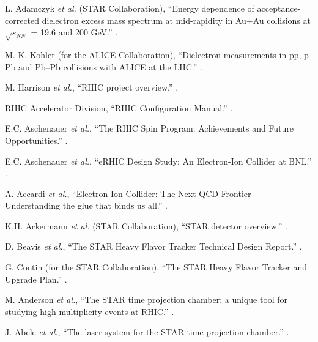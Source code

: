 \begin{thebibliography}{10}
L. Adamczyk {\it et al.} (STAR Collaboration),
\newblock ``Energy dependence of acceptance-corrected dielectron excess mass spectrum at mid-rapidity in Au+Au collisions at $\sqrt{s_{NN}}$ = 19.6 and 200 GeV.''
.

M. K. Kohler (for the ALICE Collaboration),
\newblock ``Dielectron measurements in pp, p–Pb and Pb–Pb collisions with ALICE at the LHC.''
.

M. Harrison {\it et al.},
\newblock ``RHIC project overview.''
.

RHIC Accelerator Division,
\newblock ``RHIC Configuration Manual.''
.

E.C. Aschenauer {\it et al.},
\newblock ``The RHIC Spin Program: Achievements and Future Opportunities.''
.

E.C. Aschenauer {\it et al.},
\newblock ``eRHIC Design Study: An Electron-Ion Collider at BNL.''
.

A. Accardi {\it et al.},
\newblock ``Electron Ion Collider: The Next QCD Frontier - Understanding the glue that binds us all.''
.

K.H. Ackermann {\it et al.} (STAR Collaboration),
\newblock ``STAR detector overview.''
.

 D. Beavis {\it et al.},
\newblock ``The STAR Heavy Flavor Tracker Technical Design Report.''
.

G. Contin (for the STAR Collaboration),
\newblock ``The STAR Heavy Flavor Tracker and Upgrade Plan.''
.

M. Anderson {\it et al.},
\newblock ``The STAR time projection chamber: a unique tool for studying high multiplicity events at RHIC.''
.

J. Abele {\it et al.},
\newblock ``The laser system for the STAR time projection chamber.''
.


\end{thebibliography}
